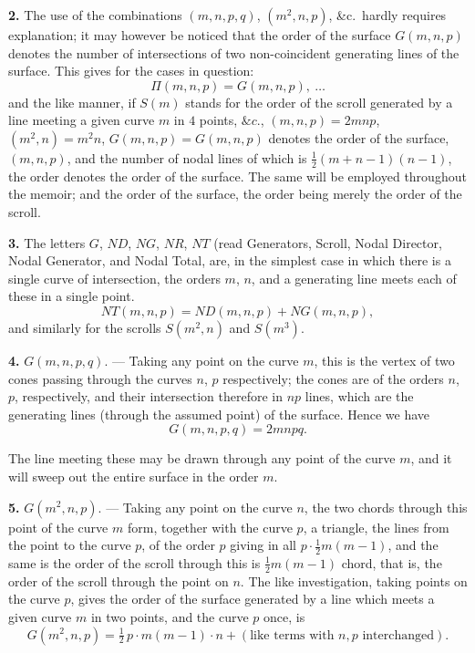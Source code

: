 \documentclass[11pt,a4paper]{article}
\begin{document}
\medskip

\noindent \textbf{2.} The use of the combinations $(m, n, p, q)$, $(m^2, n, p)$, \&c.\ hardly requires explanation; it may however be noticed that the order of the surface $G(m, n, p)$ denotes the number of intersections of two non-coincident generating lines of the surface. This gives for the cases in question:
\[
\Pi(m, n, p) = G(m, n, p),\ \ldots
\]
and the like manner, if $S(m)$ stands for the order of the scroll generated by a line meeting a given curve $m$ in $4$ points, $\&c.$, $(m, n, p) = 2mnp$, $(m^2, n) = m^2 n$, $G(m, n, p) = G(m, n, p)$ denotes the order of the surface, $(m, n, p)$, and the number of nodal lines of which is $\frac{1}{2} (m+n-1)(n-1)$, the order denotes the order of the surface. The same will be employed throughout the memoir; and the order of the surface, the order being merely the order of the scroll.

\medskip

\noindent \textbf{3.} The letters $G$, $ND$, $NG$, $NR$, $NT$ (read Generators, Scroll, Nodal Director, Nodal Generator, and Nodal Total, are, in the simplest case in which there is a single curve of intersection, the orders $m$, $n$, and a generating line meets each of these in a single point.
\[
NT(m, n, p) = ND(m, n, p) + NG(m, n, p),
\]
and similarly for the scrolls $S(m^2, n)$ and $S(m^3)$.

\medskip

\noindent \textbf{4.} $G(m, n, p, q)$. --- Taking any point on the curve $m$, this is the vertex of two cones passing through the curves $n$, $p$ respectively; the cones are of the orders $n$, $p$, respectively, and their intersection therefore in $np$ lines, which are the generating lines (through the assumed point) of the surface. Hence we have
\[
G(m, n, p, q) = 2mnpq.
\]

\medskip

\noindent The line meeting these may be drawn through any point of the curve $m$, and it will sweep out the entire surface in the order $m$.

\medskip

\noindent \textbf{5.} $G(m^2, n, p)$. --- Taking any point on the curve $n$, the two chords through this point of the curve $m$ form, together with the curve $p$, a triangle, the lines from the point to the curve $p$, of the order $p$ giving in all $p \cdot \frac{1}{2}m(m-1)$, and the same is the order of the scroll through this is $\frac{1}{2}m(m-1)$ chord, that is, the order of the scroll through the point on $n$. The like investigation, taking points on the curve $p$, gives the order of the surface generated by a line which meets a given curve $m$ in two points, and the curve $p$ once, is
\[
G(m^2, n, p) = \tfrac{1}{2}\, p \cdot m(m-1) \cdot n + (\text{like terms with }n, p\text{ interchanged}).
\]
\end{document}
